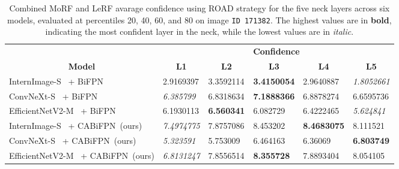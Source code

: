 \begin{table}[!htbp]
\begin{adjustbox}{max width=\textwidth}
\begin{tabular}{l|lllll|}
\cline{2-6}
\multicolumn{1}{c|}{} & \multicolumn{5}{c|}{\textbf{Confidence}} \\ \cline{1-1}
\multicolumn{1}{|c|}{\textbf{Model}} & \multicolumn{1}{c}{\textbf{L1}} & \multicolumn{1}{c}{\textbf{L2}} & \multicolumn{1}{c}{\textbf{L3}} & \multicolumn{1}{c}{\textbf{L4}} & \multicolumn{1}{c|}{\textbf{L5}} \\ \hline
\multicolumn{1}{|l|}{InternImage-S~\cite{wang2023internimage} + BiFPN~\cite{tan2020efficientdet}} & 2.9169397 & 3.3592114 & \textbf{3.4150054} & 2.9640887 & \textit{1.8052661} \\
\multicolumn{1}{|l|}{ConvNeXt-S~\cite{liu2022convnet} + BiFPN~\cite{tan2020efficientdet}} & \textit{6.385799} & 6.8318634 & \textbf{7.1888366} & 6.8878274 & 6.6595736 \\
\multicolumn{1}{|l|}{EfficientNetV2-M~\cite{tan2021efficientnetv2} + BiFPN~\cite{tan2020efficientdet}} & 6.1930113 & \textbf{6.560341} & 6.082729 & 6.4222465 & \textit{5.624841} \\ \hline
\multicolumn{1}{|l|}{InternImage-S~\cite{wang2023internimage} + CABiFPN~(ours)} & \textit{7.4974775} & 7.8757086 & 8.453202 & \textbf{8.4683075} & 8.111521 \\
\multicolumn{1}{|l|}{ConvNeXt-S~\cite{liu2022convnet} + CABiFPN~(ours)} & \textit{5.323591} & 5.753009 & 6.464163 & 6.36069 & \textbf{6.803749} \\
\multicolumn{1}{|l|}{EfficientNetV2-M~\cite{tan2021efficientnetv2} + CABiFPN~(ours)} & \textit{6.8131247} & 7.8556514 & \textbf{8.355728} & 7.8893404 & 8.054105 \\ \hline
\end{tabular}
\end{adjustbox}
\caption[Combined MoRF and LeRF avarage confidence using ROAD strategy on image \texttt{ID 171382}.]{Combined MoRF and LeRF avarage confidence using ROAD strategy for the five neck layers across six models, evaluated at percentiles 20, 40, 60, and 80 on image \texttt{ID 171382}. The highest values are in \textbf{bold}, indicating the most confident layer in the neck, while the lowest values are in \textit{italic}.}
\label{tab:results:171382:comb-road}
\end{table}


